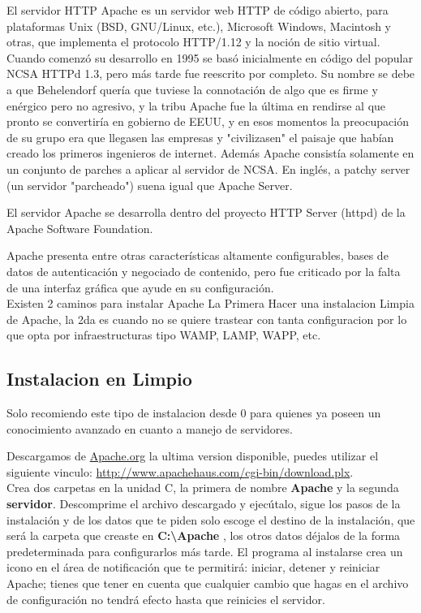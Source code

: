 El servidor HTTP Apache es un servidor web HTTP de código abierto, para plataformas
Unix (BSD, GNU/Linux, etc.), Microsoft Windows, Macintosh y otras, que implementa
el protocolo HTTP/1.12 y la noción de sitio virtual. Cuando comenzó su desarrollo en 1995 se basó inicialmente
en código del popular NCSA HTTPd 1.3, pero más tarde fue reescrito por completo. Su nombre se
debe a que Behelendorf quería que tuviese la connotación de algo que es firme
y enérgico pero no agresivo, y la tribu Apache fue la última en rendirse al que pronto se
convertiría en gobierno de EEUU, y en esos momentos la preocupación de su grupo era que
llegasen las empresas y "civilizasen" el paisaje que habían creado los primeros ingenieros de internet.
Además Apache consistía solamente en un conjunto de parches a aplicar al servidor de NCSA.
En inglés, a patchy server (un servidor "parcheado") suena igual que Apache Server. 

El servidor Apache se desarrolla dentro del proyecto HTTP Server (httpd) de la
Apache Software Foundation.

Apache presenta entre otras características altamente configurables, bases de
datos de autenticación y negociado de contenido, pero fue criticado por la falta
de una interfaz gráfica que ayude en su configuración.\\[0.2cm]

Existen 2 caminos para instalar Apache La Primera Hacer una instalacion Limpia
de Apache, la 2da es cuando no se quiere trastear con tanta configuracion por lo que
opta por infraestructuras tipo WAMP, LAMP, WAPP, etc.

\subsection{Instalacion en Limpio}

Solo recomiendo este tipo de instalacion desde 0 para quienes ya poseen un conocimiento
avanzado en cuanto a manejo de servidores.

Descargamos de \url{Apache.org} la ultima version disponible, puedes utilizar el siguiente
vinculo: \url{http://www.apachehaus.com/cgi-bin/download.plx}. \\ 
Crea dos carpetas en la unidad C, la primera de nombre {\bfseries Apache} y la segunda
{\bfseries servidor}. Descomprime el archivo descargado y ejecútalo,
sigue los pasos de la instalación y de los datos que te piden solo escoge el
destino de la instalación, que será la carpeta que creaste en
{\bfseries C:\textbackslash Apache }, los otros datos déjalos de la forma
predeterminada para configurarlos más tarde.
El programa al instalarse crea un icono en el área de notificación que te
permitirá: iniciar, detener y reiniciar Apache; tienes que tener en cuenta que
cualquier cambio que hagas en el archivo de configuración no tendrá efecto
hasta que reinicies el servidor.

